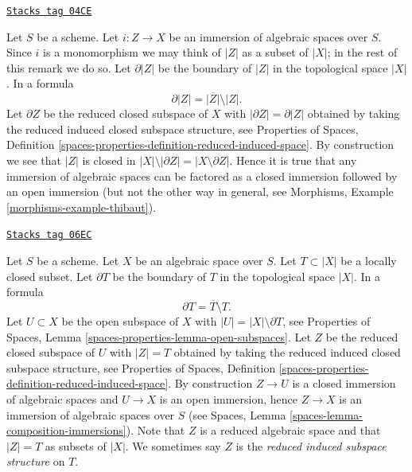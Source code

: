 \begin{remark}[Immersion]
\label{spaces-morphisms-remark-immersion}
\href{https://stacks.math.columbia.edu/tag/04CE}{\texttt{Stacks tag 04CE}}

Let $S$ be a scheme. Let $i : Z \to X$ be an immersion of algebraic
spaces over $S$. Since $i$ is a monomorphism we may think of $|Z|$ as
a subset of $|X|$; in the rest of this remark we do so.
Let $\partial |Z|$ be the boundary of $|Z|$ in
the topological space $|X|$. In a formula
$$
\partial |Z| = \overline{|Z|} \setminus |Z|.
$$
Let $\partial Z$ be the reduced closed subspace of $X$ with
$|\partial Z| = \partial |Z|$
obtained by taking the reduced induced closed subspace structure, see
Properties of Spaces,
Definition \ref{spaces-properties-definition-reduced-induced-space}.
By construction we see that $|Z|$ is closed in
$|X| \setminus |\partial Z| = |X \setminus \partial Z|$.
Hence it is true that any immersion of algebraic spaces can be
factored as a closed immersion followed by an open immersion
(but not the other way in general, see
Morphisms, Example \ref{morphisms-example-thibaut}).
\end{remark}

\begin{remark}
\label{spaces-morphisms-remark-space-structure-locally-closed-subset}
\href{https://stacks.math.columbia.edu/tag/06EC}{\texttt{Stacks tag 06EC}}

Let $S$ be a scheme. Let $X$ be an algebraic space over $S$.
Let $T \subset |X|$ be a locally closed subset.
Let $\partial T$ be the boundary of $T$ in
the topological space $|X|$. In a formula
$$
\partial T = \overline{T} \setminus T.
$$
Let $U \subset X$ be the open subspace of $X$ with
$|U| = |X| \setminus \partial T$, see
Properties of Spaces, Lemma \ref{spaces-properties-lemma-open-subspaces}.
Let $Z$ be the reduced closed subspace of $U$ with
$|Z| = T$ obtained by taking the reduced induced
closed subspace structure, see
Properties of Spaces,
Definition \ref{spaces-properties-definition-reduced-induced-space}.
By construction $Z \to U$ is a closed immersion of algebraic spaces
and $U \to X$ is an open immersion, hence
$Z \to X$ is an immersion of algebraic spaces over $S$ (see
Spaces, Lemma \ref{spaces-lemma-composition-immersions}).
Note that $Z$ is a reduced algebraic space and that
$|Z| = T$ as subsets of $|X|$. We sometimes say
$Z$ is the {\it reduced induced subspace structure} on $T$.
\end{remark}

